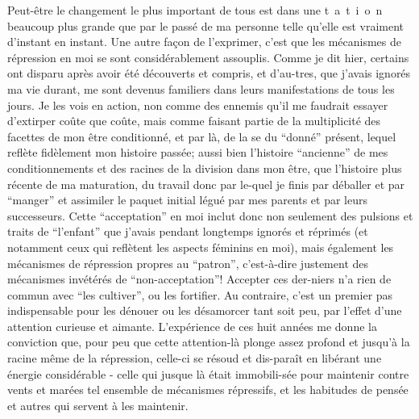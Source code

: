 Peut-être le changement le plus important de tous est dans une \mbox{}\linebreak\mbox{t a t i o n} beaucoup plus grande que par le passé de ma personne telle qu'elle est vraiment d'instant en instant. Une autre façon de l'exprimer, c'est que les mécanismes de répression en moi se sont considérablement assouplis. Comme je  dit hier, certains ont disparu après avoir été découverts et compris, et d'au-\linebreak tres, que j'avais ignorés ma vie durant, me sont devenus familiers dans leurs manifestations de tous les jours. Je les vois en action, non comme des ennemis qu'il me faudrait essayer d'extirper coûte que coûte, mais comme faisant partie de la multiplicité des facettes de mon être conditionné, et par là, de la \linebreak se du ``donné'' présent, lequel reflète fidèlement mon histoire passée; aussi bien l'histoire ``ancienne'' de mes conditionnements et des racines de la division dans mon être, que l'histoire plus récente de ma maturation, du travail donc par le-\linebreak quel je finis par déballer et par ``manger'' et assimiler le paquet initial légué par mes parents et par leurs successeurs. Cette ``acceptation'' en moi inclut donc\unsure{:} non seulement des pulsions et traits de ``l'enfant'' que j'avais pendant longtemps ignorés et réprimés (et notamment ceux qui reflètent les aspects féminins en moi), mais également les mécanismes de répression propres au ``patron'', c'est-à-dire justement des mécanismes invétérés de ``non-acceptation''! Accepter ces der-\linebreak niers n'a rien de commun avec ``les cultiver'', ou les fortifier. Au contraire, c'est un premier pas indispensable pour les dénouer ou les désamorcer tant soit peu, par l'effet d'une attention curieuse et aimante. L'expérience de ces huit années me donne la conviction que, pour peu que cette attention-là plonge assez profond et jusqu'à la racine même de la répression, celle-ci se résoud et dis-\linebreak paraît en libérant une énergie considérable - celle qui jusque là était immobili-\linebreak sée pour maintenir contre vents et marées tel ensemble de mécanismes répressifs, et les habitudes de pensée et autres qui servent à les maintenir.

